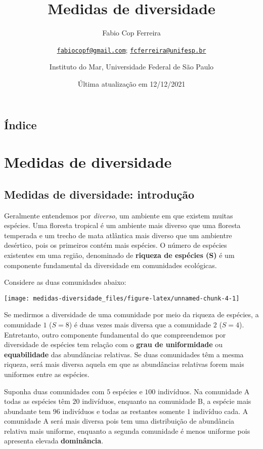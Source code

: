 \documentclass[
]{book}
\title{Medidas de diversidade}
\author{Fabio Cop Ferreira \and \href{mailto:fabiocopf@gmail.com}{\nolinkurl{fabiocopf@gmail.com}}; \href{mailto:fcferreira@unifesp.br}{\nolinkurl{fcferreira@unifesp.br}} \and Instituto do Mar, Universidade Federal de São Paulo}
\date{Última atualização em 12/12/2021}
\begin{document}
\maketitle

{
\setcounter{tocdepth}{1}
\tableofcontents
}
\hypertarget{uxedndice}{%
\chapter*{Índice}\label{uxedndice}}

\hypertarget{part-medidas-de-diversidade}{%
\part{Medidas de diversidade}\label{part-medidas-de-diversidade}}

\hypertarget{introdiversidade}{%
\chapter{Medidas de diversidade: introdução}\label{introdiversidade}}

Geralmente entendemos por \emph{diverso}, um ambiente em que existem muitas espécies. Uma floresta tropical é um ambiente mais diverso que uma floresta temperada e um trecho de mata atlântica mais diverso que um ambientre desértico, pois os primeiros contém mais espécies. O número de espécies existentes em uma região, denominado de \textbf{riqueza de espécies (S)} é um componente fundamental da diversidade em comunidades ecológicas.

Considere as duas comunidades abaixo:

\begin{center}\texttt{[image: medidas-diversidade\_files/figure-latex/unnamed-chunk-4-1]} \end{center}

Se medirmos a diversidade de uma comunidade por meio da riqueza de espécies, a comunidade \(1\) (\(S = 8\)) é duas vezes mais diversa que a comunidade \(2\) (\(S = 4\)). Entretanto, outro componente fundamental do que compreendemos por diversidade de espécies tem relação com o \textbf{grau de uniformidade} ou \textbf{equabilidade} das abundâncias relativas. Se duas comunidades têm a mesma riqueza, será mais diversa aquela em que as abundâncias relativas forem mais uniformes entre as espécies.

Suponha duas comunidades com \(5\) espécies e \(100\) indivíduos. Na comunidade A todas as espécies têm \(20\) indivíduos, enquanto na comunidade B, a espécie mais abundante tem \(96\) indivíduos e todas as restantes somente \(1\) indivíduo cada. A comunidade A será mais diversa pois tem uma distribuição de abundância relativa mais uniforme, enquanto a segunda comunidade é menos uniforme pois apresenta elevada \textbf{dominância}.
\end{document}
